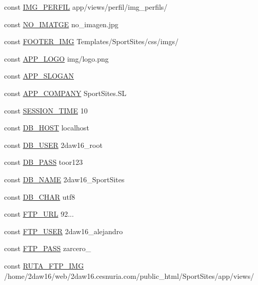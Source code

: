 \begin{DoxyCompactItemize}
const \hyperlink{_config_8php_a7a7d5f4ae58a3c132de78a3c4ebfc794}{I\+M\+G\+\_\+\+P\+E\+R\+F\+I\+L} \textquotesingle{}app/views/perfil/img\+\_\+perfils/\textquotesingle{}
\item 
const \hyperlink{_config_8php_ac568aefee1c511d54dbe03f7be516a91}{N\+O\+\_\+\+I\+M\+A\+T\+G\+E} \textquotesingle{}no\+\_\+imagen.\+jpg\textquotesingle{}
\item 
const \hyperlink{_config_8php_ae13c9487d0dca2826beb7bb4e7e10d2c}{F\+O\+O\+T\+E\+R\+\_\+\+I\+M\+G} \textquotesingle{}Templates/Sport\+Sites/css/imgs/\textquotesingle{}
\item 
const \hyperlink{_config_8php_a6258d495ac54e2ef923ec328f09693a6}{A\+P\+P\+\_\+\+L\+O\+G\+O} \textquotesingle{}img/logo.\+png\textquotesingle{}
\item 
const \hyperlink{_config_8php_ab4ed970440bc54e9b4f4c4533b32ed7f}{A\+P\+P\+\_\+\+S\+L\+O\+G\+A\+N} \textquotesingle{}\textquotesingle{}
\item 
const \hyperlink{_config_8php_a3a9898264231492488c0204d4716e94d}{A\+P\+P\+\_\+\+C\+O\+M\+P\+A\+N\+Y} \textquotesingle{}Sport\+Sites.\+S\+L\textquotesingle{}
\item 
const \hyperlink{_config_8php_a7a117a7005f451700303761ecfb3e667}{S\+E\+S\+S\+I\+O\+N\+\_\+\+T\+I\+M\+E} 10
\item 
const \hyperlink{_config_8php_a293363d7988627f671958e2d908c202a}{D\+B\+\_\+\+H\+O\+S\+T} \textquotesingle{}localhost\textquotesingle{}
\item 
const \hyperlink{_config_8php_a1d1d99f8e08f387d84fe9848f3357156}{D\+B\+\_\+\+U\+S\+E\+R} \textquotesingle{}2daw16\+\_\+root\textquotesingle{}
\item 
const \hyperlink{_config_8php_a8bb9c4546d91667cfa61879d83127a92}{D\+B\+\_\+\+P\+A\+S\+S} \textquotesingle{}toor123\textquotesingle{}
\item 
const \hyperlink{_config_8php_ab5db0d3504f917f268614c50b02c53e2}{D\+B\+\_\+\+N\+A\+M\+E} \textquotesingle{}2daw16\+\_\+\+Sport\+Sites\textquotesingle{}
\item 
const \hyperlink{_config_8php_ac39b082e3110f9c9d60da88c896ec24b}{D\+B\+\_\+\+C\+H\+A\+R} \textquotesingle{}utf8\textquotesingle{}
\item 
const \hyperlink{_config_8php_a64b8bb02e0a91804da5c96fd1e8c4524}{F\+T\+P\+\_\+\+U\+R\+L} \textquotesingle{}92...\textquotesingle{}
\item 
const \hyperlink{_config_8php_ad31b2d7395edad837e866efcb600c069}{F\+T\+P\+\_\+\+U\+S\+E\+R} \textquotesingle{}2daw16\+\_\+alejandro\textquotesingle{}
\item 
const \hyperlink{_config_8php_acf48de49a3ea2107b52209cfdf360bee}{F\+T\+P\+\_\+\+P\+A\+S\+S} \textquotesingle{}zarcero\+\_\textquotesingle{}
\item 
const \hyperlink{_config_8php_ab40a5165d5db4e95fa11a44bf620b467}{R\+U\+T\+A\+\_\+\+F\+T\+P\+\_\+\+I\+M\+G} \textquotesingle{}/home/2daw16/web/2daw16.\+cesnuria.\+com/public\+\_\+html/\+Sport\+Sites/app/views/\textquotesingle{}
\end{DoxyCompactItemize}


